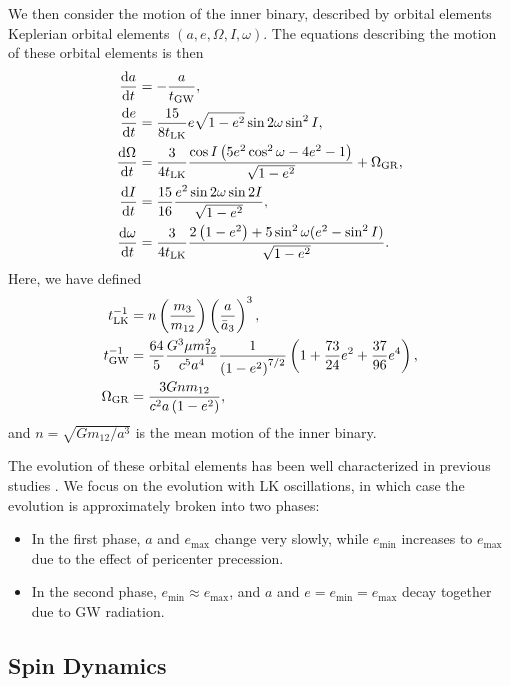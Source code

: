 \documentclass[
        fleqn,
        usenatbib,
    ]{mnras}
\newcommand*{\rd}[2]{\frac{\mathrm{d}#1}{\mathrm{d}#2}}
\newcommand*{\p}[1]{\left(#1\right)}
\begin{document}
We then consider the motion of the inner binary, described by orbital elements
Keplerian orbital elements $(a, e, \Omega, I, \omega)$. The equations describing
the motion of these orbital elements is then \citep{peters1964,storch,bin2}
\begin{align}
    \rd{a}{t} &= -\frac{a}{t_{\rm GW}},\\
    \rd{e}{t} &= \frac{15}{8t_{\rm LK}} e\sqrt{1 - e^2}\sin 2\omega
        \sin^2 I,\\
    \rd{\Omega}{t} &= \frac{3}{4t_{\rm LK}}
        \frac{\cos I\p{5e^2 \cos^2\omega - 4e^2 - 1}}{\sqrt{1 - e^2}}
        + \Omega_{\rm GR},\\
    \rd{I}{t} &= \frac{15}{16}\frac{e^2\sin 2\omega \sin 2I}{
        \sqrt{1 - e^2}},\\
    \rd{\omega}{t} &= \frac{3}{4t_{\rm LK}}
        \frac{2\p{1 - e^2} + 5\sin^2\omega
            (e^2 - \sin^2 I)}{\sqrt{1 - e^2}}.
\end{align}
Here, we have defined
\begin{align}
    t_{\rm LK}^{-1} &= n\p{\frac{m_3}{m_{12}}}\p{\frac{a}{\bar{a}_3}}^3,\\
    t_{\rm GW}^{-1} &= \frac{64}{5}\frac{G^3 \mu m_{12}^2}{c^5a^4}
        \frac{1}{\p{1 - e^2}^{7/2}}\p{1 + \frac{73}{24}e^2
            + \frac{37}{96}e^4},\\
    \Omega_{\rm GR} &= \frac{3Gnm_{12}}{c^2a\p{1 - e^2}},
\end{align}
and $n = \sqrt{Gm_{12}/a^3}$ is the mean motion of the inner binary.

The evolution of these orbital elements has been well characterized in previous
studies \citep{anderson2016formation,bin1}. We focus on the evolution with LK
oscillations, in which case the evolution is approximately broken into two
phases:
\begin{itemize}
    \item In the first phase, $a$ and $e_{\max}$ change very slowly, while
        $e_{\min}$ increases to $e_{\max}$ due to the effect of pericenter
        precession.

    \item In the second phase, $e_{\min} \approx e_{\max}$, and $a$ and $e =
        e_{\min} = e_{\max}$ decay together due to GW radiation.
\end{itemize}

\subsection{Spin Dynamics}
\end{document}
